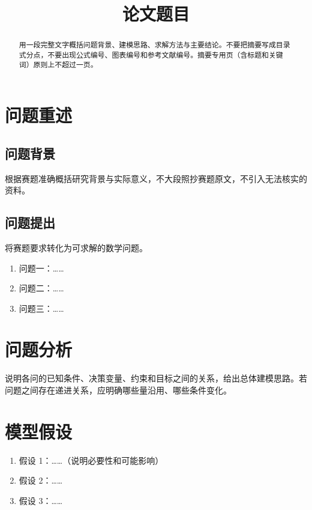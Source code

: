\documentclass[withoutpreface,bwprint]{cumcmthesis}
\title{论文题目}
\begin{document}
\maketitle

\begin{abstract}
\noindent
用一段完整文字概括问题背景、建模思路、求解方法与主要结论。不要把摘要写成目录式分点，不要出现公式编号、图表编号和参考文献编号。摘要专用页（含标题和关键词）原则上不超过一页。

\end{abstract}

\section{问题重述}

\subsection{问题背景}

根据赛题准确概括研究背景与实际意义，不大段照抄赛题原文，不引入无法核实的资料。

\subsection{问题提出}

将赛题要求转化为可求解的数学问题。

\begin{enumerate}
  \item 问题一：……
  \item 问题二：……
  \item 问题三：……
\end{enumerate}

\section{问题分析}

说明各问的已知条件、决策变量、约束和目标之间的关系，给出总体建模思路。若问题之间存在递进关系，应明确哪些量沿用、哪些条件变化。

\section{模型假设}

\begin{enumerate}
  \item 假设 1：……（说明必要性和可能影响）
  \item 假设 2：……
  \item 假设 3：……
\end{enumerate}
\end{document}
